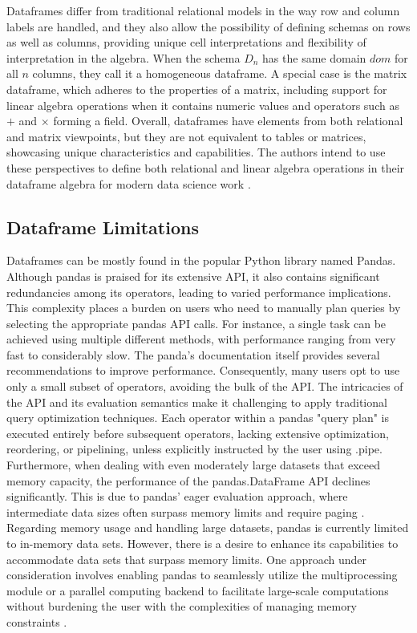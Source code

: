 Dataframes differ from traditional relational models in the way row and column labels are handled, and they also allow the possibility of defining schemas on rows as well as columns, providing unique cell interpretations and flexibility of interpretation in the algebra. When the schema \(D_n\) has the same domain \(dom\) for all \(n\) columns, they call it a homogeneous dataframe. A special case is the matrix dataframe, which adheres to the properties of a matrix, including support for linear algebra operations when it contains numeric values and operators such as \(+\) and \(\times\) forming a field. Overall, dataframes have elements from both relational and matrix viewpoints, but they are not equivalent to tables or matrices, showcasing unique characteristics and capabilities. The authors intend to use these perspectives to define both relational and linear algebra operations in their dataframe algebra for modern data science work \cite{abiteboul1995foundations}\cite{petersohn2020scalable}.

\subsection{Dataframe Limitations}

Dataframes can be mostly found in the popular Python library named Pandas. Although pandas is praised for its extensive API, it also contains significant redundancies among its operators, leading to varied performance implications. This complexity places a burden on users who need to manually plan queries by selecting the appropriate pandas API calls. For instance, a single task can be achieved using multiple different methods, with performance ranging from very fast to considerably slow. The panda's documentation itself provides several recommendations to improve performance. Consequently, many users opt to use only a small subset of operators, avoiding the bulk of the API. The intricacies of the API and its evaluation semantics make it challenging to apply traditional query optimization techniques. Each operator within a pandas "query plan" is executed entirely before subsequent operators, lacking extensive optimization, reordering, or pipelining, unless explicitly instructed by the user using .pipe. Furthermore, when dealing with even moderately large datasets that exceed memory capacity, the performance of the pandas.DataFrame API declines significantly. This is due to pandas' eager evaluation approach, where intermediate data sizes often surpass memory limits and require paging \cite{petersohn2020scalable}. Regarding memory usage and handling large datasets, pandas is currently limited to in-memory data sets. However, there is a desire to enhance its capabilities to accommodate data sets that surpass memory limits. One approach under consideration involves enabling pandas to seamlessly utilize the multiprocessing module or a parallel computing backend to facilitate large-scale computations without burdening the user with the complexities of managing memory constraints \cite{McKinney2011}.

